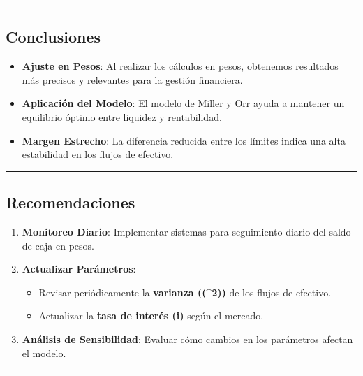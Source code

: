 \documentclass[
  letterpaper,
  DIV=11,
  numbers=noendperiod]{scrartcl}
\providecommand{\tightlist}{%
  \setlength{\itemsep}{0pt}\setlength{\parskip}{0pt}}\usepackage{longtable,booktabs,array}
\begin{document}
\begin{center}\rule{0.5\linewidth}{0.5pt}\end{center}

\subsection{Conclusiones}\label{conclusiones}

\begin{itemize}
\tightlist
\item
  \textbf{Ajuste en Pesos}: Al realizar los cálculos en pesos, obtenemos
  resultados más precisos y relevantes para la gestión financiera.
\item
  \textbf{Aplicación del Modelo}: El modelo de Miller y Orr ayuda a
  mantener un equilibrio óptimo entre liquidez y rentabilidad.
\item
  \textbf{Margen Estrecho}: La diferencia reducida entre los límites
  indica una alta estabilidad en los flujos de efectivo.
\end{itemize}

\begin{center}\rule{0.5\linewidth}{0.5pt}\end{center}

\subsection{Recomendaciones}\label{recomendaciones}

\begin{enumerate}
\def\labelenumi{\arabic{enumi}.}
\tightlist
\item
  \textbf{Monitoreo Diario}: Implementar sistemas para seguimiento
  diario del saldo de caja en pesos.
\item
  \textbf{Actualizar Parámetros}:

  \begin{itemize}
  \tightlist
  \item
    Revisar periódicamente la \textbf{varianza ((\sigma\^{}2))} de los
    flujos de efectivo.
  \item
    Actualizar la \textbf{tasa de interés (i)} según el mercado.
  \end{itemize}
\item
  \textbf{Análisis de Sensibilidad}: Evaluar cómo cambios en los
  parámetros afectan el modelo.
\end{enumerate}

\begin{center}\rule{0.5\linewidth}{0.5pt}\end{center}
\end{document}
